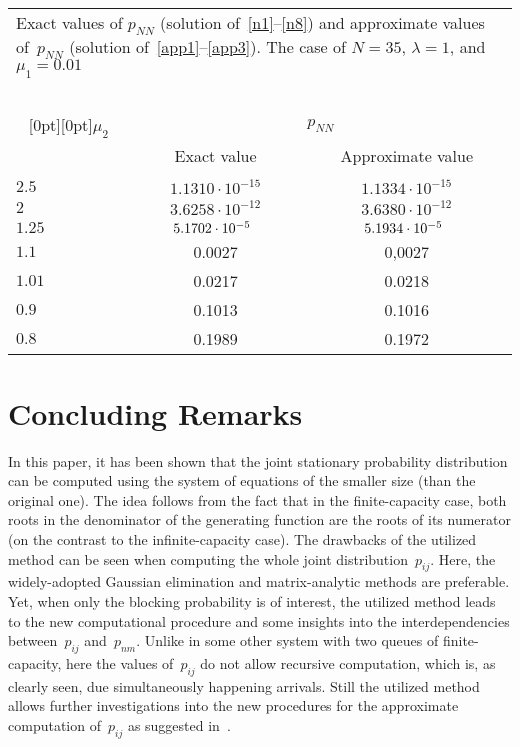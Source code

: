 \begin{multicols}{2}
{\small
\begin{center}

\begin{tabular}{lcc}
\multicolumn{3}{p{65mm}}{Exact values of $p_{NN}$ (solution of~\eqref{n1}--\eqref{n8})
and approximate values of~$p_{NN}$ (solution of~\eqref{app1}--\eqref{app3}). 
The case of $N=35$,
$\lambda=1$, and $\mu_1=0.01$}\\
\multicolumn{3}{c}{\ }\\[-6pt]
\hline 
\multicolumn{1}{c}{\raisebox{-6pt}[0pt][0pt]{$\mu_2$}} & \multicolumn{2}{c}{$p_{NN}$}\\
\cline{2-3}
& Exact value  & Approximate value\\  
\hline 
&&\\[-9pt]
$2.5$ & $1.1310\cdot 10^{-15}$ & $1.1334\cdot 10^{-15}$  \\ 
$2$ & $3.6258\cdot 10^{-12}$ & $3.6380\cdot 10^{-12}$  \\ 
$1.25$ & $5.1702\cdot 10^{-5}\hphantom{^1}$ & $5.1934\cdot 10^{-5}\hphantom{^1}$  \\ 
$1.1$ & 0.0027 & 0,0027 \\ 
$1.01$ & 0.0217 & 0.0218  \\ 
$0.9$ & 0.1013 & 0.1016  \\ 
$0.8$ & 0.1989 & 0.1972  \\ 
\hline 
\end{tabular} 
\end{center}
}


\section{Concluding Remarks}

\noindent
In this paper, it  has been shown that the joint stationary probability distribution
can be computed using the system of equations
of the smaller size (than the original one).
The idea follows from the fact that in the finite-capacity
case, both roots in the denominator of the generating function 
are the roots of its numerator (on the contrast to the infinite-capacity case).
The drawbacks of the utilized method can be seen when computing 
the whole joint distribution~$p_{ij}$. Here, the widely-adopted
Gaussian elimination and matrix-analytic methods are preferable.
Yet, when only the blocking probability is of interest,
the utilized method leads to the new computational procedure and
some insights into the interdependencies between~$p_{ij}$ and~$p_{nm}$. 
Unlike in some other system with two queues of 
finite-capacity, here the values of~$p_{ij}$ do not allow 
recursive computation, which is, as clearly seen, due simultaneously happening arrivals.
Still the utilized method allows further investigations into
the new procedures for the approximate computation of~$p_{ij}$ as suggested 
in~\cite{NEW2}.


\end{multicols}
